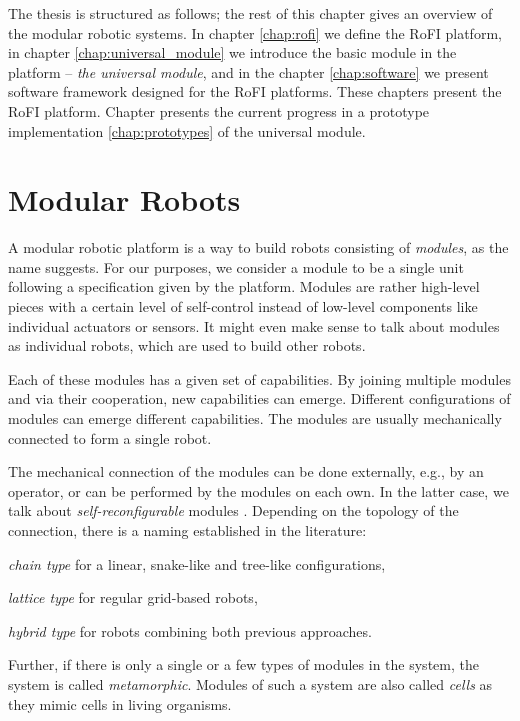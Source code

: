 The thesis is structured as follows; the rest of this chapter gives an overview
of the modular robotic systems. In chapter \ref{chap:rofi} we define the RoFI
platform, in chapter \ref{chap:universal_module} we introduce the basic module
in the platform -- \emph{the universal module}, and in the chapter
\ref{chap:software} we present software framework designed for the RoFI
platforms. These chapters present the RoFI platform. Chapter presents the
current progress in a prototype implementation \ref{chap:prototypes} of the
universal module.

\section{Modular Robots}

A modular robotic platform is a way to build robots consisting of
\emph{modules}, as the name suggests. For our purposes, we consider a module to
be a single unit following a specification given by the platform. Modules are
rather high-level pieces with a certain level of self-control instead of
low-level components like individual actuators or sensors. It might even make
sense to talk about modules as individual robots, which are used to build other
robots\cite{brunete_current_2017}.

Each of these modules has a given set of capabilities. By joining multiple
modules and via their cooperation, new capabilities can emerge. Different
configurations of modules can emerge different capabilities. The modules are
usually mechanically connected to form a single robot.

The mechanical connection of the modules can be done externally, e.g., by an
operator, or can be performed by the modules on each own. In the latter case, we
talk about \emph{self-reconfigurable} modules \cite{brunete_current_2017}.
Depending on the topology of the connection, there is a naming established in
the literature\cite{brunete_current_2017}:
\begin{enumerate*}
    \item \emph{chain type} for a linear, snake-like and tree-like
    configurations,
    \item \emph{lattice type} for regular grid-based robots,
    \item \emph{hybrid type} for robots combining both previous approaches.
\end{enumerate*}
Further, if there is only a single or a few types of modules in the system, the
system is called \emph{metamorphic}\cite{brunete_current_2017}. Modules of such
a system are also called \emph{cells} as they mimic cells in living organisms.

